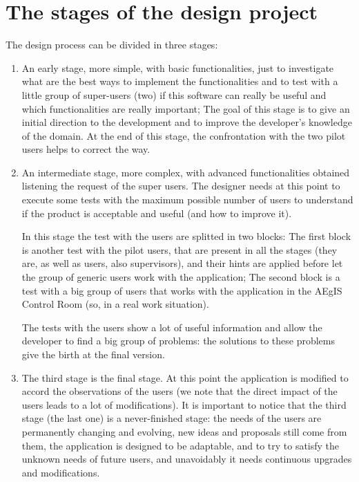 \section{The stages of the design project}

The design process can be divided in three stages:

\begin{enumerate}

\item An early stage, more simple, with basic functionalities, just to investigate what are the best ways to implement the functionalities and to test with a little group of super-users (two) if this software can really be useful and which functionalities are really important; The goal of this stage is to give an initial direction to the development and to improve the developer's knowledge of the domain. At the end of this stage, the confrontation with the two pilot users helps to correct the way.

\item An intermediate stage, more complex, with advanced functionalities obtained listening the request of the super users.  
The designer needs at this point to execute some tests with the maximum possible number of users to understand if the product is acceptable and useful (and how to improve it). 

In this stage the test with the users are splitted in two blocks:  
The first block is another test with the pilot users, that are present in all the stages (they are, as well as users, also supervisors), and their hints are applied before let the group of generic users work with the application;
The second block is a test with a big group of users that works with the application in the AEgIS Control Room (so, in a real work situation).

The tests with the users show a lot of useful information and allow the developer to find a big group of problems: the solutions to these problems give the birth at the final version. 

\item
The third stage is the final stage. At this point the application is modified to accord the observations of the users (we note that the direct impact of the users leads to a lot of modifications). It is important to notice that the third stage (the last one) is a never-finished stage: the needs of the users are permanently changing and evolving, new ideas and proposals still come from them, the application is designed to be adaptable, and to try to satisfy the unknown needs of future users, and unavoidably it needs continuous upgrades and modifications. 

\end{enumerate}


